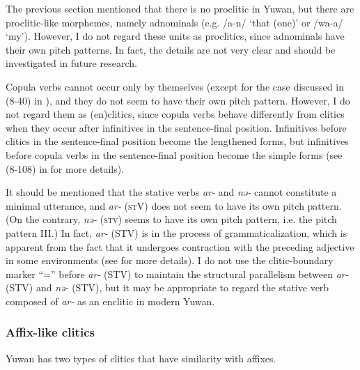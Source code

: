 The previous section mentioned that there is no proclitic in Yuwan, but there are proclitic-like morphemes, namely adnominals (e.g. /a-n/ ‘that (one)’ or /wa-a/ ‘my’). However, I do not regard these units as proclitics, since adnominals have their own pitch patterns. In fact, the details are not very clear and should be investigated in future research.

Copula verbs cannot occur only by themselves (except for the case discussed in (8-40) in ), and they do not seem to have their own pitch pattern. However, I do not regard them as (en)clitics, since copula verbs behave differently from clitics when they occur after infinitives in the sentence-final position. Infinitives before clitics in the sentence-final position become the lengthened forms, but infinitives before copula verbs in the sentence-final position become the simple forms (see (8-108) in  for more details).

It should be mentioned that the stative verbs \textit{ar-} and \textit{nə-} cannot constitute a minimal utterance, and \textit{ar-} (\textsc{st}V) does not seem to have its own pitch pattern. (On the contrary, \textit{nə-} (\textsc{stv}) seems to have its own pitch pattern, i.e. the pitch pattern III.) In fact, \textit{ar-} (STV) is in the process of grammaticalization, which is apparent from the fact that it undergoes contraction with the preceding adjective in some environments (see  for more details). I do not use the clitic-boundary marker “=” before \textit{ar-} (STV) to maintain the structural parallelism between \textit{ar-} (STV) and \textit{nə-} (STV), but it may be appropriate to regard the stative verb composed of \textit{ar-} as an enclitic in modern Yuwan.

\subsubsection{Affix-like clitics}\label{sec:4.2.2.2}

Yuwan has two types of clitics that have similarity with affixes.

